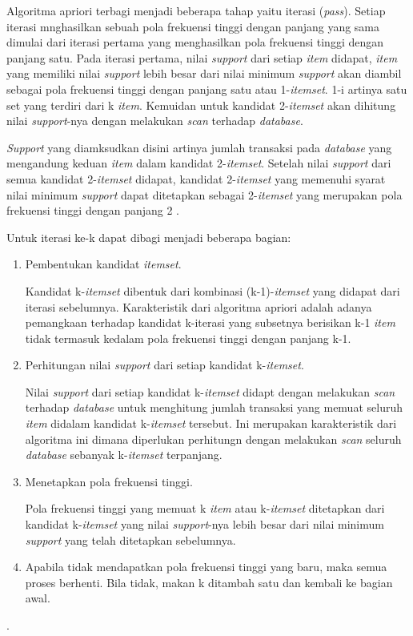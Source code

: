 \pagebreak
\par Algoritma apriori terbagi menjadi beberapa tahap yaitu iterasi (\textit{pass}). Setiap iterasi mnghasilkan sebuah pola frekuensi tinggi dengan panjang yang sama dimulai dari iterasi pertama yang menghasilkan pola frekuensi tinggi dengan panjang satu. Pada iterasi pertama, nilai \textit{support} dari setiap \textit{item} didapat, \textit{item} yang memiliki nilai \textit{support} lebih besar dari nilai minimum \textit{support} akan diambil sebagai pola frekuensi tinggi dengan panjang satu atau 1-\textit{itemset}. 1-i artinya satu set yang terdiri dari k \textit{item}. Kemuidan untuk kandidat 2-\textit{itemset} akan dihitung nilai \textit{support}-nya dengan melakukan \textit{scan} terhadap \textit{database}.
\par
\textit{Support} yang diamksudkan disini artinya jumlah transaksi pada \textit{database} yang mengandung keduan \textit{item} dalam kandidat 2-\textit{itemset}. Setelah nilai \textit{support} dari semua kandidat 2-\textit{itemset} didapat, kandidat 2-\textit{itemset} yang memenuhi syarat nilai minimum \textit{support} dapat ditetapkan sebagai 2-\textit{itemset} yang merupakan pola frekuensi tinggi dengan panjang 2 \cite{nursikuwagus2016implementasi}.
\par
Untuk iterasi ke-k dapat dibagi menjadi beberapa bagian:
 \begin{enumerate}
\item Pembentukan kandidat \textit{itemset}.
\par Kandidat k-\textit{itemset} dibentuk dari kombinasi (k-1)-\textit{itemset} yang didapat dari iterasi sebelumnya. Karakteristik dari algoritma apriori adalah adanya pemangkaan terhadap kandidat k-iterasi yang subsetnya berisikan k-1 \textit{item} tidak termasuk kedalam pola frekuensi tinggi dengan panjang k-1.
\item Perhitungan nilai \textit{support} dari setiap kandidat k-\textit{itemset}.
\par Nilai \textit{support} dari setiap kandidat k-\textit{itemset} didapt dengan melakukan \textit{scan} terhadap \textit{database} untuk menghitung jumlah transaksi yang memuat seluruh \textit{item} didalam kandidat k-\textit{itemset} tersebut. Ini merupakan karakteristik dari algoritma ini dimana diperlukan perhitungn dengan melakukan \textit{scan} seluruh \textit{database} sebanyak k-\textit{itemset} terpanjang.
\item Menetapkan pola frekuensi tinggi.

\par 
Pola frekuensi tinggi yang memuat k \textit{item} atau k-\textit{itemset} ditetapkan dari kandidat k-\textit{itemset} yang nilai \textit{support}-nya lebih besar dari nilai minimum \textit{support} yang telah ditetapkan sebelumnya.
\item Apabila tidak mendapatkan pola frekuensi tinggi yang baru, maka semua proses berhenti. Bila tidak, makan k ditambah satu dan kembali ke bagian awal.
\end{enumerate}
.
\\
\\
\\
\\
\\
\\
